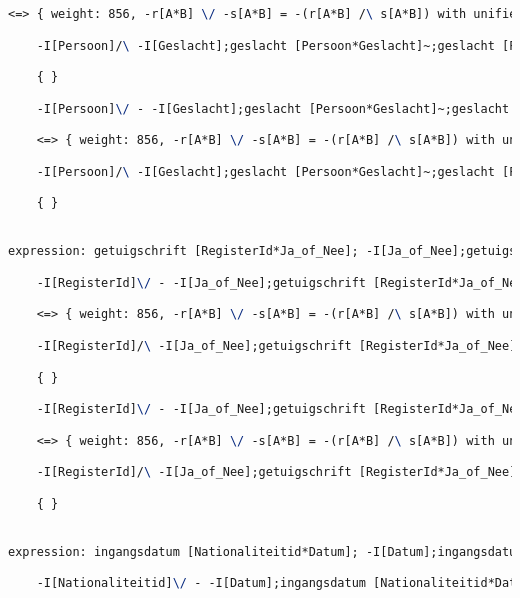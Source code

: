 \begin{lstlisting}[language=TeX]
    <=> { weight: 856, -r[A*B] \/ -s[A*B] = -(r[A*B] /\ s[A*B]) with unifier: {A->I[Persoon], B->I[Persoon], r->geslacht [Persoon*Geslacht];-I[Geslacht];geslacht [Persoon*Geslacht]~, s->I[Persoon]} }

    -I[Persoon]/\ -I[Geslacht];geslacht [Persoon*Geslacht]~;geslacht [Persoon*Geslacht]

    { }

    -I[Persoon]\/ - -I[Geslacht];geslacht [Persoon*Geslacht]~;geslacht [Persoon*Geslacht]

    <=> { weight: 856, -r[A*B] \/ -s[A*B] = -(r[A*B] /\ s[A*B]) with unifier: {A->I[Persoon], B->I[Persoon], r->I[Persoon], s->geslacht [Persoon*Geslacht];-I[Geslacht];geslacht [Persoon*Geslacht]~} }

    -I[Persoon]/\ -I[Geslacht];geslacht [Persoon*Geslacht]~;geslacht [Persoon*Geslacht]

    { }


expression: getuigschrift [RegisterId*Ja_of_Nee]; -I[Ja_of_Nee];getuigschrift [RegisterId*Ja_of_Nee]~ |- -I[RegisterId]

    -I[RegisterId]\/ - -I[Ja_of_Nee];getuigschrift [RegisterId*Ja_of_Nee]~;getuigschrift [RegisterId*Ja_of_Nee]

    <=> { weight: 856, -r[A*B] \/ -s[A*B] = -(r[A*B] /\ s[A*B]) with unifier: {A->I[RegisterId], B->I[RegisterId], r->getuigschrift [RegisterId*Ja_of_Nee];-I[Ja_of_Nee];getuigschrift [RegisterId*Ja_of_Nee]~, s->I[RegisterId]} }

    -I[RegisterId]/\ -I[Ja_of_Nee];getuigschrift [RegisterId*Ja_of_Nee]~;getuigschrift [RegisterId*Ja_of_Nee]

    { }

    -I[RegisterId]\/ - -I[Ja_of_Nee];getuigschrift [RegisterId*Ja_of_Nee]~;getuigschrift [RegisterId*Ja_of_Nee]

    <=> { weight: 856, -r[A*B] \/ -s[A*B] = -(r[A*B] /\ s[A*B]) with unifier: {A->I[RegisterId], B->I[RegisterId], r->I[RegisterId], s->getuigschrift [RegisterId*Ja_of_Nee];-I[Ja_of_Nee];getuigschrift [RegisterId*Ja_of_Nee]~} }

    -I[RegisterId]/\ -I[Ja_of_Nee];getuigschrift [RegisterId*Ja_of_Nee]~;getuigschrift [RegisterId*Ja_of_Nee]

    { }


expression: ingangsdatum [Nationaliteitid*Datum]; -I[Datum];ingangsdatum [Nationaliteitid*Datum]~ |- -I[Nationaliteitid]

    -I[Nationaliteitid]\/ - -I[Datum];ingangsdatum [Nationaliteitid*Datum]~;ingangsdatum [Nationaliteitid*Datum]


\end{lstlisting}
